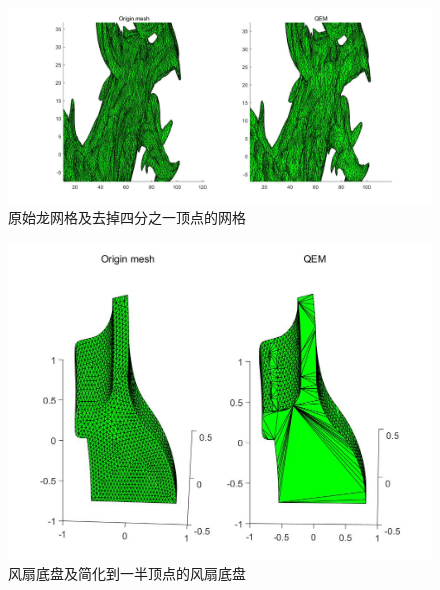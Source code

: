 \documentclass[a4paper]{ltxdoc}
\begin{document}
\begin{figure}[H]
  \centering
 \includegraphics[width=1.0\textwidth]{fig1.jpg}
  \caption{原始龙网格及去掉四分之一顶点的网格}
\end{figure}
\begin{figure}[H]
  \centering
 \includegraphics[width=1.0\textwidth]{fig2.jpg}
  \caption{风扇底盘及简化到一半顶点的风扇底盘}
\end{figure}
\end{document}
